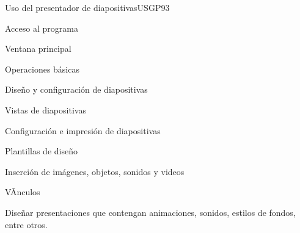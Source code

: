 \begin{syllabus}
\begin{unit}{Uso del presentador de diapositivas}{USGP}{9}{3}
\begin{topics}
      \item Acceso al programa
      \item Ventana principal
      \item Operaciones básicas
      \item Diseño y configuración de diapositivas
      \item Vistas de diapositivas
      \item Configuración e impresión de diapositivas
      \item Plantillas de diseño 
      \item Inserción de imágenes, objetos, sonidos y videos
      \item VÃ­nculos
\end{topics}
\begin{unitgoals}
   \item Diseñar presentaciones que contengan animaciones, sonidos, estilos de fondos, entre otros.
\end{unitgoals}
\end{unit}

\begin{coursebibliography}

\end{coursebibliography}

\end{syllabus}
